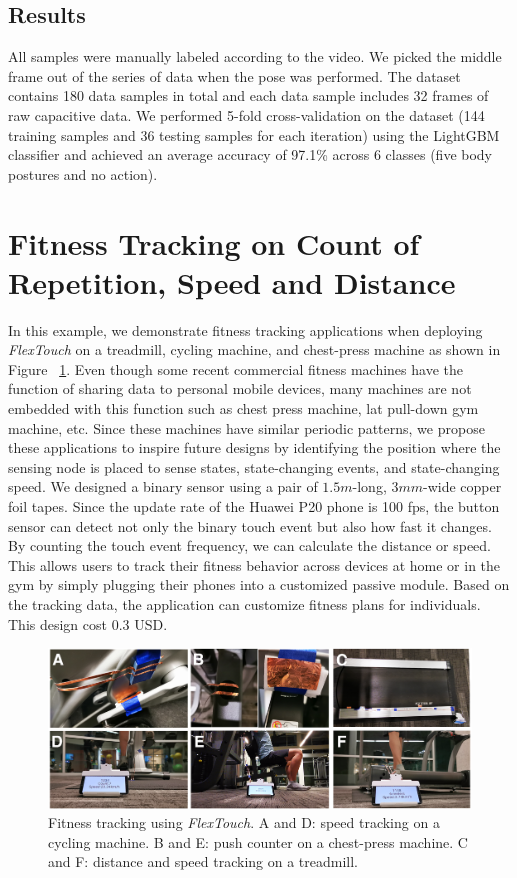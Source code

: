 \subsection{Results}
All samples were manually labeled according to the video. We picked the middle frame out of the series of data when the pose was performed. The dataset contains 180 data samples in total and each data sample includes 32 frames of raw capacitive data. We performed 5-fold cross-validation on the dataset (144 training samples and 36 testing samples for each iteration) using the LightGBM classifier and achieved an average accuracy of 97.1\% across 6 classes (five body postures and no action).

\section{Fitness Tracking on Count of Repetition, Speed and Distance}
In this example, we demonstrate fitness tracking applications when deploying \textit{FlexTouch} on a treadmill, cycling machine, and chest-press machine as shown in Figure ~\ref{fig:fitness}. Even though some recent commercial fitness machines have the function of sharing data to personal mobile devices, many machines are not embedded with this function such as chest press machine, lat pull-down gym machine, etc. Since these machines have similar periodic patterns, we propose these applications to inspire future designs by identifying the position where the sensing node is placed to sense states, state-changing events, and state-changing speed. We designed a binary sensor using a pair of $1.5m$-long, $3 mm$-wide copper foil tapes. Since the update rate of the Huawei P20 phone is 100 fps, the button sensor can detect not only the binary touch event but also how fast it changes. By counting the touch event frequency, we can calculate the distance or speed. This allows users to track their fitness behavior across devices at home or in the gym by simply plugging their phones into a customized passive module. Based on the tracking data, the application can customize fitness plans for individuals. This design cost 0.3 USD.

\begin{figure}[ht]
\centering
  \includegraphics[width=0.95\columnwidth]{figures/gym.png}
  \setlength{\belowcaptionskip}{-4pt}
  \caption{Fitness tracking using \textit{FlexTouch}. A and D: speed tracking on a cycling machine. B and E: push counter on a chest-press machine. C and F: distance and speed tracking on a treadmill.}  
  \label{fig:fitness}
\end{figure}

